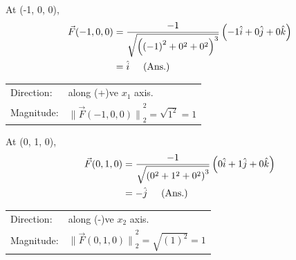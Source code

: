 \documentclass[11pt]{article} %
\begin{document}
\begin{enumerate}
\begin{enumerate}[\textbf{(\alph*)}]
At (-1, 0, 0),
\begin{equation*}
\begin{split}
\Vec F (-1, 0, 0) &=\frac{-1}{\sqrt{{\left({\left(-1\right)}^2+0^2+0^2\right)}^3}}\left(-1\hat i  + 0\hat j  + 0\hat k \right) \\
&= \hat i \hspace{0.5cm} \text{(Ans.)}
\end{split}
\end{equation*}
\begin{tabular}{ll}
Direction: &along (+)ve $x_1$ axis. \\
Magnitude:  &${\| \Vec F (-1, 0, 0) \|}_2^2 = \sqrt{1^2} = 1$
\end{tabular}

At (0, 1, 0),
\begin{equation*}
\begin{split}
\Vec F (0, 1, 0) &=\frac{-1}{\sqrt{{\left(0^2+1^2+0^2\right)}^3}}\left(0\hat i  + 1\hat j  + 0\hat k \right) \\
&= -\hat j \hspace{0.5cm} \text{(Ans.)}
\end{split}
\end{equation*}
\begin{tabular}{ll}
Direction: &along (-)ve $x_2$ axis. \\
Magnitude:  &${\| \Vec F (0, 1, 0) \|}_2^2 = \sqrt{{\left(1\right)}^2} = 1$
\end{tabular}
\end{enumerate}


\end{enumerate}
\end{document}
